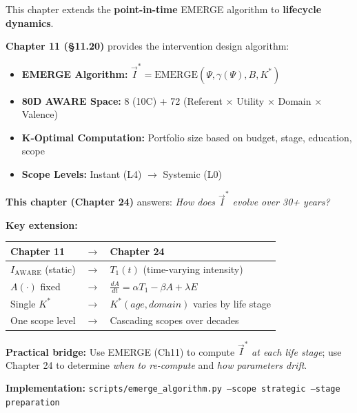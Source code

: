 \begin{tcolorbox}[colback=blue!5!white, colframe=blue!75!black,
    title=\textbf{Cross-Reference: EMERGE Algorithm (Chapter 11)}]

This chapter extends the \textbf{point-in-time} EMERGE algorithm to \textbf{lifecycle dynamics}.

\textbf{Chapter 11 (§11.20)} provides the intervention design algorithm:
\begin{itemize}[nosep]
    \item \textbf{EMERGE Algorithm:} $\vec{I}^* = \text{EMERGE}(\Psi, \gamma(\Psi), B, K^*)$
    \item \textbf{80D AWARE Space:} 8 (10C) + 72 (Referent × Utility × Domain × Valence)
    \item \textbf{K-Optimal Computation:} Portfolio size based on budget, stage, education, scope
    \item \textbf{Scope Levels:} Instant (L4) $\to$ Systemic (L0)
\end{itemize}

\textbf{This chapter (Chapter 24)} answers: \emph{How does $\vec{I}^*$ evolve over 30+ years?}

\textbf{Key extension:}
\begin{center}
\small
\begin{tabular}{@{}lll@{}}
\textbf{Chapter 11} & $\to$ & \textbf{Chapter 24} \\
\midrule
$I_{\text{AWARE}}$ (static) & $\to$ & $T_1(t)$ (time-varying intensity) \\
$A(·)$ fixed & $\to$ & $\frac{dA}{dt} = \alpha T_1 - \beta A + \lambda E$ \\
Single $K^*$ & $\to$ & $K^*(age, domain)$ varies by life stage \\
One scope level & $\to$ & Cascading scopes over decades \\
\end{tabular}
\end{center}

\textbf{Practical bridge:} Use EMERGE (Ch11) to compute $\vec{I}^*$ \emph{at each life stage}; use Chapter 24 to determine \emph{when to re-compute} and \emph{how parameters drift}.

\textbf{Implementation:} \texttt{scripts/emerge\_algorithm.py --scope strategic --stage preparation}

\end{tcolorbox}


